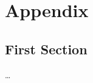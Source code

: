 

{\chapter{Appendix}}    %
\label{chap:appendix}


\section{First Section}
\label{sec:appendix:FirstSection}
		
\setcounter{figure}{0}
		

\dots